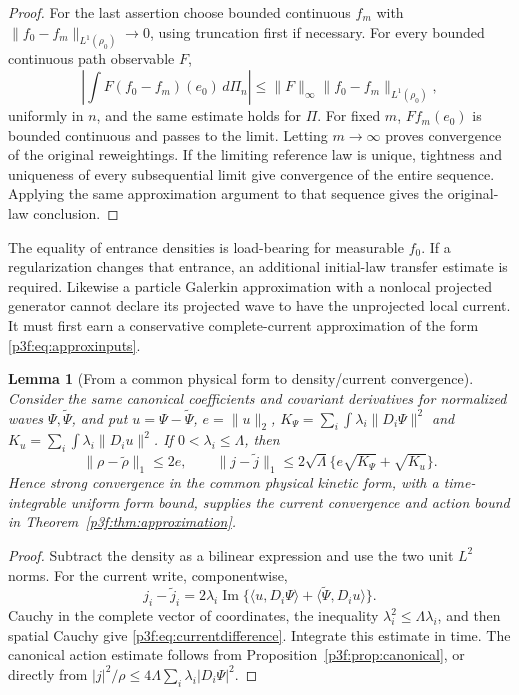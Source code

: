 \documentclass[11pt]{article}
\numberwithin{equation}{section}
\newtheorem{lemma}[theorem]{Lemma}
\theoremstyle{definition}
\theoremstyle{remark}
\begin{document}
\begin{proof}
For the last assertion choose bounded continuous $f_m$ with
$\|f_0-f_m\|_{L^1(\rho_0)}\to0$, using truncation first if
necessary. For every bounded continuous path observable $F$,
\[
 \left|\int F(f_0-f_m)(e_0)\,d\Pi_n\right|
 \leq\|F\|_\infty\|f_0-f_m\|_{L^1(\rho_0)} ,
\]
uniformly in $n$, and the same estimate holds for $\Pi$.
For fixed $m$, $Ff_m(e_0)$ is bounded continuous and passes to
the limit. Letting $m\to\infty$ proves convergence of the original
reweightings. If the limiting reference law is unique, tightness
and uniqueness of every subsequential limit give convergence of
the entire sequence. Applying the same approximation argument
to that sequence gives the original-law conclusion.
\end{proof}

The equality of entrance densities is load-bearing for measurable
$f_0$. If a regularization changes that entrance, an additional
initial-law transfer estimate is required. Likewise a particle
Galerkin approximation with a nonlocal projected generator cannot
declare its projected wave to have the unprojected local current.
It must first earn a conservative complete-current approximation
of the form \eqref{p3f:eq:approxinputs}.

\begin{lemma}[From a common physical form to density/current convergence]
\label{p3f:lem:formcurrent}
Consider the same canonical coefficients and covariant derivatives
for normalized waves $\Psi,\widetilde\Psi$, and put
$u=\Psi-\widetilde\Psi$,
$e=\|u\|_2$,
$K_\Psi=\sum_i\int\lambda_i\|D_i\Psi\|^2$ and
$K_u=\sum_i\int\lambda_i\|D_i u\|^2$.
If $0<\lambda_i\leq\Lambda$, then
\begin{equation}\label{p3f:eq:currentdifference}
 \|\rho-\widetilde\rho\|_1\leq2e,\qquad
 \|j-\widetilde j\|_1
 \leq2\sqrt\Lambda\{e\sqrt{K_\Psi}+\sqrt{K_u}\}.
\end{equation}
Hence strong convergence in the common physical kinetic form,
with a time-integrable uniform form bound, supplies the current
convergence and action bound in
Theorem~\ref{p3f:thm:approximation}.
\end{lemma}

\begin{proof}
Subtract the density as a bilinear expression and use the two unit
$L^2$ norms. For the current write, componentwise,
\[
 j_i-\widetilde j_i
 =2\lambda_i\operatorname{Im}
       \{\langle u,D_i\Psi\rangle
          +\langle\widetilde\Psi,D_i u\rangle\}.
\]
Cauchy in the complete vector of coordinates, the inequality
$\lambda_i^2\leq\Lambda\lambda_i$, and then spatial Cauchy
give \eqref{p3f:eq:currentdifference}. Integrate this estimate in
time. The canonical action estimate follows from
Proposition~\ref{p3f:prop:canonical}, or directly from
$|j|^2/\rho\leq4\Lambda\sum_i\lambda_i|D_i\Psi|^2$.
\end{proof}
\end{document}
